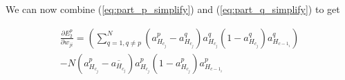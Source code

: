 We can now combine (\ref{eq:part_p_simplify}) and (\ref{eq:part_q_simplify}) to get

\begin{align}
  \frac{\partial E_2^p}{\partial w_{ji}} = (\sum_{q=1, q \neq p}^N (a_{H_{c_j}}^p-a_{H_{c_j}}^q) a_{H_{c_j}}^q(1-a_{H_{c_j}}^q) a_{H_{c-1_i}}^q) \nonumber \\
  - N(a_{H_{c_j}}^p-\overline{a_{H_{c_j}}}) a_{H_{c_j}}^p(1-a_{H_{c_j}}^p) a_{H_{c-1_i}}^p
\end{align}






